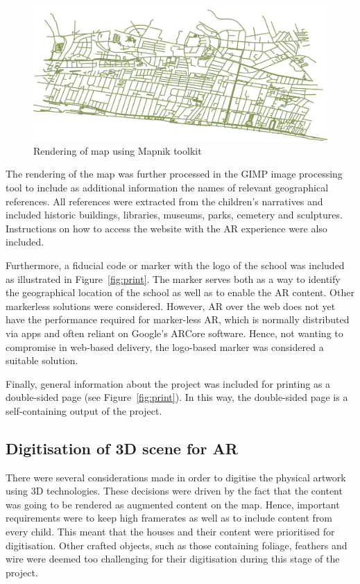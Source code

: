\documentclass[acmlarge,screen,dvipsnames]{acmart}
\begin{document}
\begin{figure}[b]
\includegraphics[width=\linewidth]{images/maprender.jpg}
\caption{Rendering of map using Mapnik toolkit} \label{fig:map} 
\end{figure}
 
The rendering of the map was further processed in the GIMP image processing
tool \cite{gimp} to include as additional information the names of relevant
geographical references. All references were extracted from the children's
narratives and included historic buildings, libraries, museums, parks,
cemetery and sculptures. Instructions on how to access the website with the AR
experience were also included.

Furthermore, a fiducial code or marker with the logo of the school was
included as illustrated in Figure~\ref{fig:print}. The marker serves both as a
way to identify the geographical location of the school as well as to enable
the AR content. Other markerless solutions were considered. However, AR over
the web does not yet have the performance required for marker-less AR, which
is normally distributed via apps and often reliant on Google's ARCore
software. Hence, not wanting to compromise in web-based delivery, the
logo-based marker was considered a suitable solution.


Finally, general information about the project was included for printing as a
double-sided page (see Figure~\ref{fig:print}). In this way, the double-sided
page is a self-containing output of the project.



\subsection{Digitisation of 3D scene for AR} There were several considerations
made in order to digitise the physical artwork using 3D technologies. These
decisions were driven by the fact that the content was going to be rendered as
augmented content on the map. Hence, important requirements were to keep high
framerates as well as to include content from every child. This meant that the
houses and their content were prioritised for digitisation. Other crafted objects, 
such as those containing foliage, feathers and wire were deemed too challenging 
for their digitisation during this stage of the project.
\end{document}
